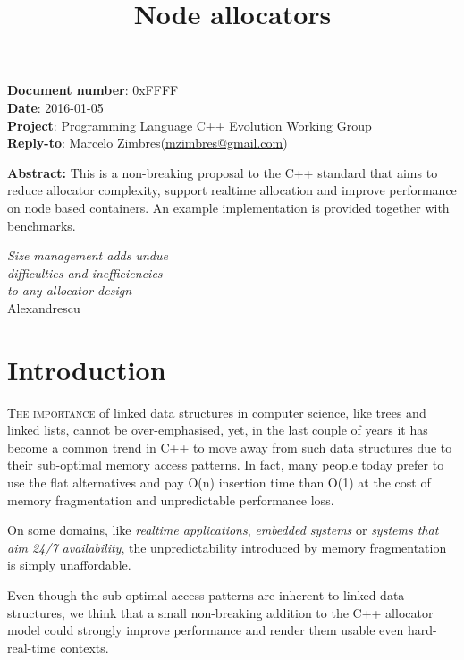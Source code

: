 \documentclass[11pt]{article}
\begin{document}
\date{}
\title{\bf Node allocators}

\maketitle

\noindent
{\bf Document number}:  0xFFFF \\
{\bf Date}:  2016-01-05 \\
{\bf Project}: Programming Language C++ Evolution Working Group \\
{\bf Reply-to}: Marcelo Zimbres(\href{mailto:mzimbres@gmail.com}{mzimbres@gmail.com}) 

\vspace{1cm}

\noindent
{\bf Abstract: }This is a non-breaking proposal to the C++ standard
that aims to reduce allocator complexity, support realtime allocation
and improve performance on node based containers. An example
implementation is provided together with benchmarks.

\tableofcontents

\begin{flushright}
\noindent
{\it Size management adds undue \\
difficulties and inefficiencies \\
to any allocator design} \\
Alexandrescu \\
\medskip
{\it }
\end{flushright}
\medskip

\section{Introduction}
\textsc{The importance} of linked data structures in computer science,
like trees and linked lists, cannot be over-emphasised, yet, in the
last couple of years it has become a common trend in C++ to move away
from such data structures due to their sub-optimal memory access
patterns.  In fact, many people today prefer to use the flat
alternatives and pay O(n) insertion time than O(1) at the cost of
memory fragmentation and unpredictable performance loss.

On some domains, like {\it realtime applications}, {\it embedded
systems} or {\it systems that aim 24/7 availability}, the
unpredictability introduced by memory fragmentation is simply
unaffordable.

Even though the sub-optimal access patterns are inherent to
linked data structures, we think that a small non-breaking
addition to the C++ allocator model could strongly improve
performance and render them usable even hard-real-time
contexts.
\end{document}
